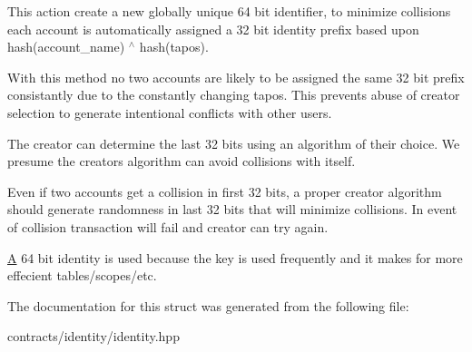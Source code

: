This action create a new globally unique 64 bit identifier, to minimize collisions each account is automatically assigned a 32 bit identity prefix based upon hash(account\+\_\+name) $^\wedge$ hash(tapos).

With this method no two accounts are likely to be assigned the same 32 bit prefix consistantly due to the constantly changing tapos. This prevents abuse of \textquotesingle{}creator\textquotesingle{} selection to generate intentional conflicts with other users.

The creator can determine the last 32 bits using an algorithm of their choice. We presume the creator\textquotesingle{}s algorithm can avoid collisions with itself.

Even if two accounts get a collision in first 32 bits, a proper creator algorithm should generate randomness in last 32 bits that will minimize collisions. In event of collision transaction will fail and creator can try again.

\mbox{\hyperlink{struct_a}{A}} 64 bit identity is used because the key is used frequently and it makes for more effecient tables/scopes/etc. 

The documentation for this struct was generated from the following file\+:\begin{DoxyCompactItemize}
\item 
contracts/identity/identity.\+hpp\end{DoxyCompactItemize}
